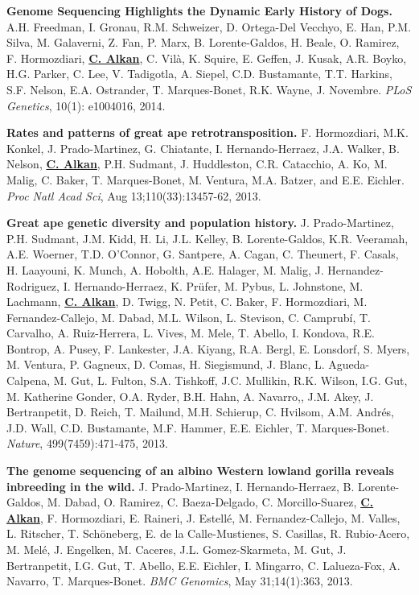  \vspace{-.2cm}        
        {\bf Genome Sequencing Highlights the Dynamic Early History of Dogs.}
        A.H. Freedman, I. Gronau, R.M. Schweizer, D. Ortega-Del Vecchyo, E. Han, P.M. Silva, M. Galaverni, Z. Fan, P. Marx, B. Lorente-Galdos, H. Beale, O. Ramirez, F. Hormozdiari, 
        {\bf {\underline{C. Alkan}}}, C. Vilà, K. Squire, E. Geffen, J. Kusak, A.R. Boyko, H.G. Parker, C. Lee, V. Tadigotla, A. Siepel, C.D. Bustamante, T.T. Harkins, 
        S.F. Nelson, E.A. Ostrander, T. Marques-Bonet, R.K. Wayne, J. Novembre. 
        {\em PLoS Genetics}, 10(1): e1004016, 2014.


 \vspace{-.2cm}        
        {\bf Rates and patterns of great ape retrotransposition.}
        F. Hormozdiari, M.K. Konkel, J. Prado-Martinez, G. Chiatante, I. Hernando-Herraez, J.A. Walker, B. Nelson, {\bf {\underline {C. Alkan}}}, P.H. Sudmant, J. Huddleston, C.R. Catacchio, A. Ko, 
        M. Malig, C. Baker, T. Marques-Bonet, M. Ventura, M.A. Batzer, and E.E. Eichler. 
        {\em Proc Natl Acad Sci}, Aug 13;110(33):13457-62, 2013.
                             

 \vspace{-.2cm}
        {\bf Great ape genetic diversity and population history.}
        J. Prado-Martinez, P.H. Sudmant, J.M. Kidd, H. Li, J.L. Kelley, B. Lorente-Galdos, K.R. Veeramah, A.E. Woerner, T.D. O’Connor, G. Santpere, A. Cagan, C. Theunert, F. Casals, H. Laayouni, K. Munch, A. Hobolth, A.E. Halager, M. Malig, J. Hernandez-Rodriguez, I. Hernando-Herraez, K. Prüfer, M. Pybus, L. Johnstone, M. Lachmann, {\bf {\underline {C. Alkan}}}, D. Twigg, N. Petit, C. Baker, F. Hormozdiari, M. Fernandez-Callejo, M. Dabad, M.L. Wilson, L. Stevison, C. Camprubí, T. Carvalho, A. Ruiz-Herrera, L. Vives, M. Mele, T. Abello, I. Kondova, R.E. Bontrop, A. Pusey, F. Lankester, J.A. Kiyang, R.A. Bergl, E. Lonsdorf, S. Myers, M. Ventura, P. Gagneux, D. Comas, H. Siegismund, J. Blanc, L. Agueda-Calpena, M. Gut, L. Fulton, S.A. Tishkoff, J.C. Mullikin, R.K. Wilson, I.G. Gut, M. Katherine Gonder, O.A. Ryder, B.H. Hahn, A. Navarro,, J.M. Akey, J. Bertranpetit, D. Reich, T. Mailund, M.H. Schierup, C. Hvilsom, A.M. Andrés, J.D. Wall, C.D. Bustamante, M.F. Hammer, E.E. Eichler, T. Marques-Bonet. 
        {\em Nature}, 499(7459):471-475, 2013.


 \vspace{-.2cm}
        {\bf The genome sequencing of an albino Western lowland gorilla reveals inbreeding in the wild.}
        J. Prado-Martinez, I. Hernando-Herraez, B. Lorente-Galdos, M. Dabad, O. Ramirez, C. Baeza-Delgado, C. Morcillo-Suarez, 
        {\bf {\underline {C. Alkan}}}, F. Hormozdiari, E. Raineri, J. Estellé, M. Fernandez-Callejo, M. Valles, L. Ritscher, T. Schöneberg, E. de la Calle-Mustienes, 
        S. Casillas, R. Rubio-Acero, M. Melé, J. Engelken, M. Caceres, J.L. Gomez-Skarmeta, M. Gut, J. Bertranpetit, I.G. Gut, T. Abello, 
        E.E. Eichler, I. Mingarro, C. Lalueza-Fox, A. Navarro, T. Marques-Bonet.
        {\em BMC Genomics}, May 31;14(1):363, 2013.


